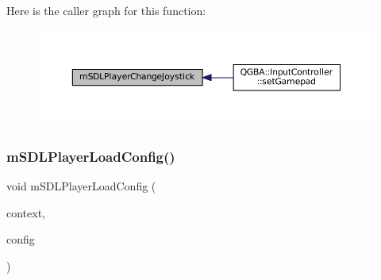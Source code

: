 Here is the caller graph for this function\+:
\nopagebreak
\begin{figure}[H]
\begin{center}
\leavevmode
\includegraphics[width=350pt]{sdl-events_8c_aed738247356e33dc5bf0ba5cff942a42_icgraph}
\end{center}
\end{figure}
\mbox{\label{sdl-events_8c_a2e6e0f34192ea8c75aaa522b1cd8ccf6}} 
\subsubsection{\texorpdfstring{m\+S\+D\+L\+Player\+Load\+Config()}{mSDLPlayerLoadConfig()}}
{\footnotesize\ttfamily void m\+S\+D\+L\+Player\+Load\+Config (\begin{DoxyParamCaption}\item[{struct \mbox{\hyperlink{sdl-events_8h_structm_s_d_l_player}{m\+S\+D\+L\+Player}} $\ast$}]{context,  }\item[{const struct Configuration $\ast$}]{config }\end{DoxyParamCaption})}

